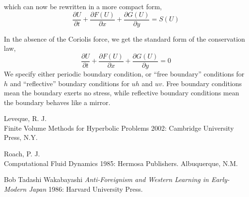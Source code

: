 which can now be rewritten in a more compact form,
\begin{equation}
 {\frac{\partial U}{\partial t} + \frac{\partial F(U)}{\partial x} + \frac{\partial G(U)}{\partial y} = S(U) } \label{eqn:2}
 \end{equation}

 
In the absence of the Coriolis force, we get the standard form of the conservation law,
\begin{equation}
{\frac{\partial U}{\partial t} + \frac{\partial F(U)}{\partial x} + \frac{\partial G(U)}{\partial y} = 0 } \label{eqn:3}
\end{equation}
We specify either periodic boundary condition, or ``free boundary'' conditions for $h$ and ``reflective'' boundary conditions for $uh$ and $uv$.
Free boundary conditions mean the boundary exerts no stress, while reflective boundary conditions mean the boundary behaves like a mirror.






\begin{thebibliography}{1}

  Leveque, R. J. {\\Finite Volume Methods for Hyperbolic Problems} 2002:
Cambridge University Press, N.Y.

 Roach, P. J. {\\Computational Fluid Dynamics} 1985: Hermosa Publishers. Albuquerque, N.M.

 Bob Tadashi Wakabayashi {\em Anti-Foreignism and Western
Learning in Early-Modern Japan} 1986: Harvard University Press.

\end{thebibliography}